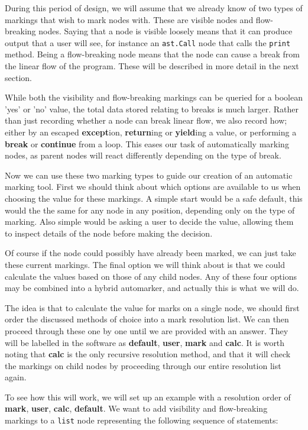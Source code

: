 \documentclass[twoside,a4paper]{report}
\begin{document}
During this period of design, we will assume that we already know of two types of markings that wish to mark nodes with. These are visible nodes
and flow-breaking nodes. Saying that a node is visible loosely means that it can produce output that a user will see, for instance an \texttt{ast.Call}
node that calls the \texttt{print} method. Being a flow-breaking node means that the node can cause a break from the linear flow of the program. These
will be described in more detail in the next section.

While both the visibility and flow-breaking markings can be queried for a boolean 'yes' or 'no' value, the total data stored relating to breaks is much
larger. Rather than just recording whether a node can break linear flow, we also record how; either by an escaped \textbf{except}ion,
\textbf{return}ing or \textbf{yield}ing a value, or performing a \textbf{break} or \textbf{continue} from a loop. This eases our task of automatically
marking nodes, as parent nodes will react differently depending on the type of break.

Now we can use these two marking types to guide our creation of an automatic marking tool. First we should think about which options are available
to us when choosing the value for these markings. A simple start would be a safe default, this would the the same for any node in any position,
depending only on the type of marking. Also simple would be asking a user to decide the value, allowing them to inspect details of the node before
making the decision.

Of course if the node could possibly have already been marked, we can just take these current markings. The final option we will think about is
that we could calculate the values based on those of any child nodes. Any of these four options may be combined into a hybrid automarker, and actually
this is what we will do.

The idea is that to calculate the value for marks on a single node, we should first order the discussed methods of choice into a mark resolution
list. We can then proceed through these one by one until we are provided with an answer. They will be labelled in the software as
\textbf{default}, \textbf{user}, \textbf{mark} and \textbf{calc}. It is worth noting that \textbf{calc} is the only recursive resolution method,
and that it will check the markings on child nodes by proceeding through our entire resolution list again.

To see how this will work, we will set up an example with a resolution order of \textbf{mark}, \textbf{user}, \textbf{calc}, \textbf{default}.
We want to add visibility and flow-breaking markings to a \texttt{list} node representing the following sequence of statements:
\end{document}
